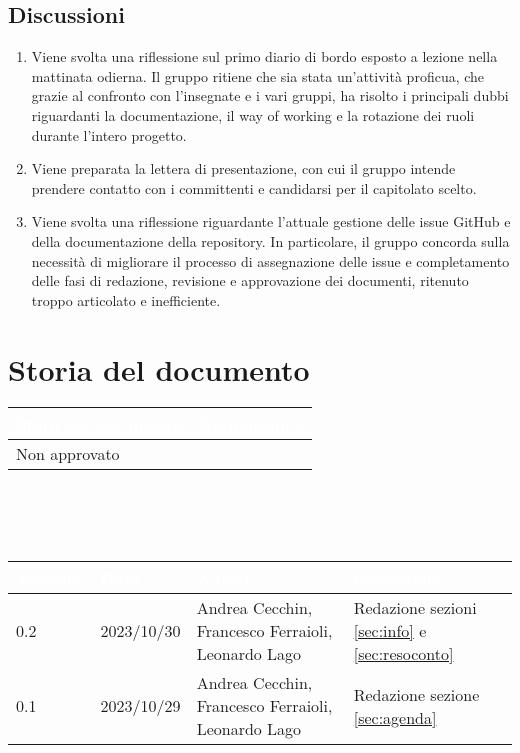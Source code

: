\documentclass[12pt]{article}
\begin{document}
\subsection{Discussioni} \label{subsec:resdiscussione}
\begin{enumerate}
    \item Viene svolta una riflessione sul primo diario di bordo esposto a lezione nella mattinata odierna. Il gruppo ritiene che sia stata un'attività proficua, che grazie al confronto con l'insegnate e i vari gruppi, ha risolto i principali dubbi riguardanti la documentazione, il way of working e la rotazione dei ruoli durante l'intero progetto.
    \item Viene preparata la lettera di presentazione, con cui il gruppo intende prendere contatto con i committenti e candidarsi per il capitolato scelto.
    \item Viene svolta una riflessione riguardante l'attuale gestione delle issue GitHub e della documentazione della repository. In particolare, il gruppo concorda sulla necessità di migliorare il processo di assegnazione delle issue e completamento delle fasi di redazione, revisione e approvazione dei documenti, ritenuto troppo articolato e inefficiente. 
    
\end{enumerate}


\section{Storia del documento} \label{sec:storia}
\begingroup
\setlength{\tabcolsep}{10pt}
\renewcommand{\arraystretch}{1.5}
\begin{tabularx}{\textwidth}{| X | X |}
    \hline
    \rowcolor{headerrow} \textbf{\textcolor{white}{Stato del documento}} & \textbf{\textcolor{white}{Responsabile}} \\
    \hline
    Non approvato &\\
    \hline   
\end{tabularx}
\\\\\\
\begingroup
\setlength{\tabcolsep}{10pt}
\renewcommand{\arraystretch}{1.5}
\begin{tabularx}{\textwidth}{| l | l | X | X |}
    \hline
    \rowcolor{headerrow} \textbf{\textcolor{white}{Versione}} & \textbf{\textcolor{white}{Data}} & \textbf{\textcolor{white}{Autori}} & \textbf{\textcolor{white}{Descrizione}} \\
     \hline
     0.2 & 2023/10/30 & Andrea Cecchin, Francesco Ferraioli, Leonardo Lago & Redazione sezioni \ref{sec:info} e \ref{sec:resoconto}\\
    \hline
    0.1 & 2023/10/29 & Andrea Cecchin, Francesco Ferraioli, Leonardo Lago & Redazione sezione \ref{sec:agenda}\\
    \hline
\end{tabularx}
\endgroup
\end{document}
